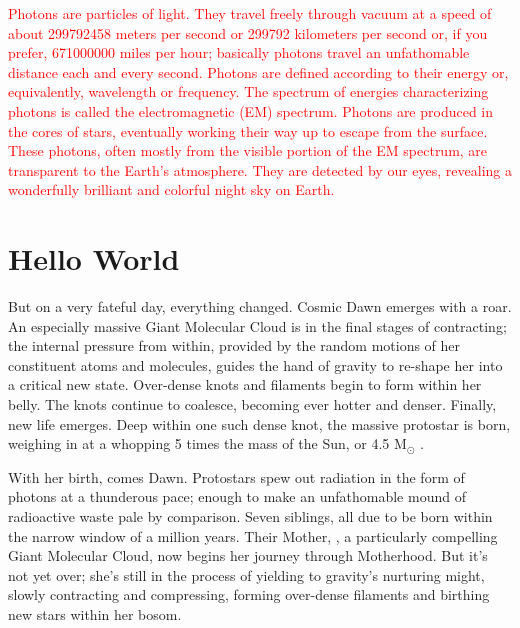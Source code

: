 \documentclass[main.tex]{subfiles}
\begin{document}
\begin{tcolorbox}[sharp corners, colback=red!30, colframe=red!80!blue, title=Photons]
\par \textcolor{red} {Photons are particles of light.  They travel freely through vacuum at a speed of about 299792458 meters per second or 299792 kilometers per second or, if you prefer, 671000000 miles per hour; basically photons travel an unfathomable distance each and every second.  Photons are defined according to their energy or, equivalently, wavelength or frequency.  The spectrum of energies characterizing photons is called the electromagnetic (EM) spectrum.  Photons are produced in the cores of stars, eventually working their way up to escape from the surface.  These photons, often mostly from the visible portion of the EM spectrum, are transparent to the Earth's atmosphere.  They are detected by our eyes, revealing a wonderfully brilliant and colorful night sky on Earth.}
\end{tcolorbox}

\section{Hello World} \label{hello}

\par \nar But on a very fateful day, everything changed.  Cosmic Dawn emerges with a roar.  An especially massive Giant Molecular Cloud is in the final stages of contracting; the internal pressure from within, provided by the random motions of her constituent atoms and molecules, guides the hand of gravity to re-shape her into a critical new state.  Over-dense knots and filaments begin to form within her belly.  The knots continue to coalesce, becoming ever hotter and denser.  Finally, new life emerges.  Deep within one such dense knot, the massive protostar \rmmaia is born, weighing in at a whopping 5 times the mass of the Sun, or 4.5 M$_{\odot}$ .

\par \nar With her birth, comes Dawn.  Protostars spew out radiation in the form of photons at a thunderous pace; enough to make an unfathomable mound of radioactive waste pale by comparison.  Seven siblings, all due to be born within the narrow window of a million years. Their Mother, \rmpleione, a particularly compelling Giant Molecular Cloud, now begins her journey through Motherhood.  But it's not yet over; she's still in the process of yielding to gravity's nurturing might, slowly contracting and compressing, forming over-dense filaments and birthing new stars within her bosom.  
\end{document}
